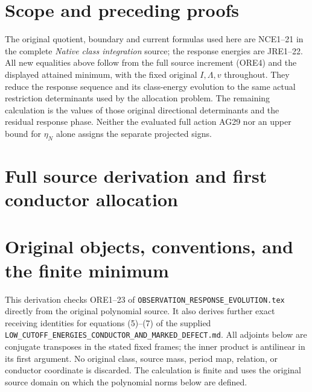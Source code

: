 \section{Scope and preceding proofs}
The original quotient, boundary and current formulas used here are
NCE1--21 in the complete \emph{Native class integration} source;
the response energies are JRE1--22. All new equalities above follow
from the full source increment (ORE4) and the displayed attained
minimum, with the fixed original $I,\Lambda,v$ throughout.
They reduce the response sequence and its class-energy evolution to
the same actual restriction determinants used by the allocation
problem. The remaining calculation is the values of those original
directional determinants and the residual response phase. Neither
the evaluated full action AG29 nor an upper bound for $\eta_N$ alone
assigns the separate projected signs.



\endgroup

\clearpage
\begingroup
\def\C{\mathbb C}
\def\R{\mathbb R}
\def\im{\operatorname{im}}
\def\lc{\operatorname{lc}}
\def\diag{\operatorname{diag}}
\def\norm#1{\left\lVert#1\right\rVert}

\setcounter{equation}{0}
\renewcommand{\theequation}{A04OID.\arabic{equation}}
\section*{Full source derivation and first conductor allocation}


\section{Original objects, conventions, and the finite minimum}

This derivation checks ORE1--23 of
\texttt{OBSERVATION\_RESPONSE\_EVOLUTION.tex} directly from the
original polynomial source. It also derives further exact receiving
identities for equations (5)--(7) of the supplied
\texttt{LOW\_CUTOFF\_ENERGIES\_CONDUCTOR\_AND\_MARKED\_DEFECT.md}.
All adjoints below are conjugate transposes in the stated fixed frames;
the inner product is antilinear in its first argument. No original
class, source mass, period map, relation, or conductor coordinate is
discarded. The calculation is finite and uses the original source
domain on which the polynomial norms below are defined.

